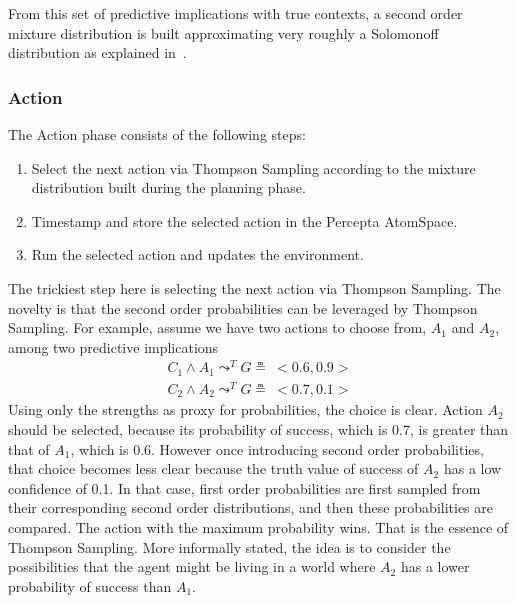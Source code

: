 \documentclass[runningheads]{llncs}
\newcommand{\lpreimp}[1]{\leadsto^{#1}}
\begin{document}
From this set of predictive implications with true contexts, a second
order mixture distribution is built approximating very roughly a
Solomonoff distribution as explained in~\cite{Geisweiller2018}.

\subsubsection{Action}

The Action phase consists of the following steps:
\begin{enumerate}
\item Select the next action via Thompson Sampling according to the
  mixture distribution built during the planning phase.
\item Timestamp and store the selected action in the Percepta
  AtomSpace.
\item Run the selected action and updates the environment.
\end{enumerate}
The trickiest step here is selecting the next action via Thompson
Sampling.  The novelty is that the second order probabilities can be
leveraged by Thompson Sampling.  For example, assume we have two
actions to choose from, $A_1$ and $A_2$, among two predictive
implications
$$
\begin{array}{c}
  C_1 \land A_1 \lpreimp{T} G \measeq\ <\!0.6, 0.9\!> \\
  C_2 \land A_2 \lpreimp{T} G \measeq\ <\!0.7, 0.1\!>
\end{array}
$$
Using only the strengths as proxy for probabilities, the choice is
clear.  Action $A_2$ should be selected, because its probability of
success, which is 0.7, is greater than that of $A_1$, which is 0.6.
However once introducing second order probabilities, that choice
becomes less clear because the truth value of success of $A_2$ has a
low confidence of 0.1.  In that case, first order probabilities are
first sampled from their corresponding second order distributions,
and then these probabilities are compared.  The action with the
maximum probability wins.  That is the essence of Thompson Sampling.
More informally stated, the idea is to consider the possibilities that
the agent might be living in a world where $A_2$ has a lower
probability of success than $A_1$.
\end{document}
